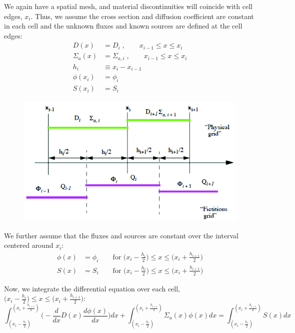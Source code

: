 \documentclass[12pt]{article}
\begin{document}
We again have a spatial mesh, and material discontinuities will coincide with cell edges, $x_i$. Thus, we assume the cross section and diffusion coefficient are constant in each cell and the unknown fluxes and known sources are defined at the cell edges:
\begin{align}
D(x) &= D_i\;, \qquad x_{i-1} \leq x \leq x_i \nonumber \\
\Sigma_a(x) &= \Sigma_{a,i}\;, \qquad x_{i-1} \leq x \leq x_i \nonumber \\
h_i &\equiv x_{i} - x_{i-1} \nonumber \\
\phi(x_i) &= \phi_i \nonumber \\
S(x_i) &= S_i \nonumber 
\end{align}
%
\begin{figure}[h!]
\includegraphics[height=2.5in]{FVM-DE}
\end{figure}

We further assume that the fluxes and sources are constant over the interval centered around $x_i$:
%
\begin{align}
\phi(x) &= \phi_i \qquad \text{for } \bigl(x_i - \frac{h_i}{2}\bigr) \leq x \leq \bigl(x_i + \frac{h_{i+1}}{2}\bigr) \nonumber \\
S(x) &= S_i \qquad \text{for } \bigl(x_i - \frac{h_i}{2}\bigr) \leq x \leq \bigl(x_i + \frac{h_{i+1}}{2}\bigr) \nonumber 
\end{align}

Now, we integrate the differential equation over each cell, $\bigl(x_i - \frac{h_i}{2}\bigr) \leq x \leq \bigl(x_i + \frac{h_{i+1}}{2}\bigr)$:
%
\[\int_{(x_i - \frac{h_i}{2})}^{(x_i + \frac{h_{i+1}}{2})} \biggl(  -\frac{d}{dx}D(x)\frac{d \phi(x)}{dx}\biggr) dx + \int_{(x_i - \frac{h_i}{2})}^{(x_i + \frac{h_{i+1}}{2})} \Sigma_a(x) \phi(x) dx = \int_{(x_i - \frac{h_i}{2})}^{(x_i + \frac{h_{i+1}}{2})} S(x) dx\]
\end{document}
